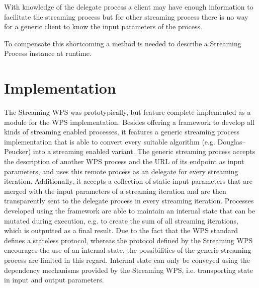   With knowledge of the delegate process a client may have enough information to facilitate the streaming process but for other streaming process there is no way for a generic client to know the input parameters of the process.

  To compensate this shortcoming a method is needed to describe a Streaming Process instance at runtime.

\section{Implementation}
  The Streaming WPS was prototypically, but feature complete implemented as a module for the \ftn WPS implementation. Besides offering a framework to develop all kinds of streaming enabled processes, it features a generic streaming process implementation that is able to convert every suitable algorithm (e.g. Douglas–Peucker) into a streaming enabled variant. The generic streaming process accepts the description of another WPS process and the URL of its endpoint as input parameters, and uses this remote process as an delegate for every streaming iteration. Additionally, it accepts a collection of static input parameters that are merged with the input parameters of a streaming iteration and are then transparently sent to the delegate process in every streaming iteration. Processes developed using the framework are able to maintain an internal state that can be mutated during execution, e.g. to create the sum of all streaming iterations, which is outputted as a final result. Due to the fact that the WPS standard defines a stateless protocol, whereas the protocol defined by the Streaming WPS encourages the use of an internal state, the possibilities of the generic streaming process are limited in this regard. Internal state can only be conveyed using the dependency mechanisms provided by the Streaming WPS, i.e. transporting state in input and output parameters.

  

